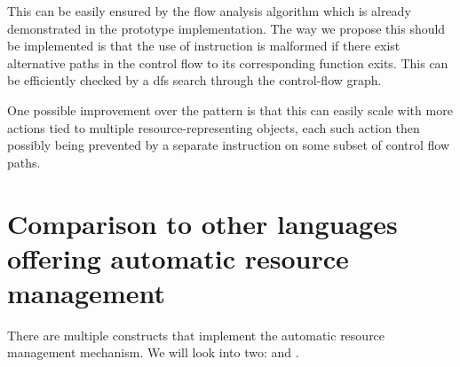 This can be easily ensured by the flow analysis algorithm which is already demonstrated in the prototype implementation. The way we propose this should be implemented is that the use of  instruction is malformed if there exist alternative paths in the control flow to its corresponding function exits. This can be efficiently checked by a dfs search through the control-flow graph.

One possible improvement over the  pattern is that this can easily scale with more actions tied to multiple resource-representing objects, each such action then possibly being prevented by a separate  instruction on some subset of control flow paths.

\section{Comparison to other languages offering automatic resource management}

There are multiple constructs that implement the automatic resource management mechanism. We will look into two:  and .
